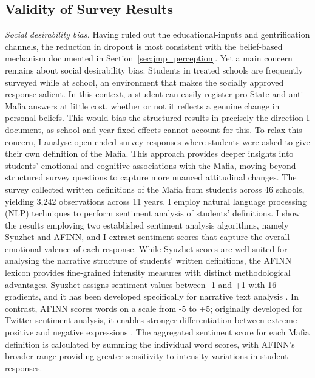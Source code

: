 \documentclass[12pt]{article}
\theoremstyle{plain}
\theoremstyle{plain}
\theoremstyle{plain}
\theoremstyle{definition}
\theoremstyle{plain}
\theoremstyle{definition}
\theoremstyle{plain}
\theoremstyle{remark}
\theoremstyle{definition}
\theoremstyle{definition}
\theoremstyle{plain}
\begin{document}
\subsection{Validity of Survey Results}
\label{sec:jmp_surveyrob}
\emph{Social desirability bias.} Having ruled out the educational-inputs and gentrification channels, the reduction in dropout is most consistent with the belief-based mechanism documented in Section~\ref{sec:jmp_perception}. Yet a main concern remains about social desirability bias. Students in treated schools are frequently surveyed while at school, an environment that makes the socially approved response salient. In this context, a student can easily register pro-State and anti-Mafia answers at little cost, whether or not it reflects a genuine change in personal beliefs. This would bias the structured results in precisely the direction I document, as school and year fixed effects cannot account for this.
To relax this concern, I analyse open-ended survey responses where students were asked to give their own definition of the Mafia. This approach provides deeper insights into students' emotional and cognitive associations with the Mafia, moving beyond structured survey questions to capture more nuanced attitudinal changes.
The survey collected written definitions of the Mafia from students across 46 schools, yielding 3,242 observations across 11 years. I employ natural language processing (NLP) techniques to perform sentiment analysis of students' definitions. I show the results employing two established sentiment analysis algorithms, namely Syuzhet and AFINN, and I extract sentiment scores that capture the overall emotional valence of each response. While Syuzhet scores are well-suited for analysing the narrative structure of students' written definitions, the AFINN lexicon provides fine-grained intensity measures with distinct methodological advantages. Syuzhet assigns sentiment values between -1 and +1 with 16 gradients, and it has been developed specifically for narrative text analysis \citep{silge_text_2017}. In contrast, AFINN scores words on a scale from -5 to +5; originally developed for Twitter sentiment analysis, it enables stronger differentiation between extreme positive and negative expressions \citep{isasi_sentiment_2021, kim_sentiment_2022}. The aggregated sentiment score for each Mafia definition is calculated by summing the individual word scores, with AFINN's broader range providing greater sensitivity to intensity variations in student responses. 
\end{document}
